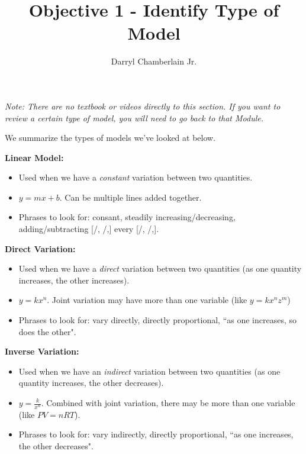 \documentclass{ximera}
\author{Darryl Chamberlain Jr.}
\title{Objective 1 - Identify Type of Model}
\begin{document}
\begin{abstract}

\end{abstract}

\maketitle
 
\textit{Note: There are no textbook or videos directly to this section. If you want to review a certain type of model, you will need to go back to that Module.}
 

We summarize the types of models we've looked at below. 

\textbf{Linear Model:}
\begin{itemize}
    \item Used when we have a \textit{constant} variation between two quantities. 
    \item $y = mx + b$. Can be multiple lines added together. 
    \item Phrases to look for: consant, steadily increasing/decreasing, adding/subtracting [/, /,] every [/, /,].
\end{itemize}

\textbf{Direct Variation:}
\begin{itemize}
    \item Used when we have a \textit{direct} variation between two quantities (as one quantity increases, the other increases).
    \item $y = kx^n$. Joint variation may have more than one variable (like $y = kx^n z^m$)
    \item Phrases to look for: vary directly, directly proportional, ``as one increases, so does the other".
\end{itemize}

\textbf{Inverse Variation:}
\begin{itemize}
    \item Used when we have an \textit{indirect} variation between two quantities (as one quantity increases, the other decreases). 
    \item $y = \frac{k}{x^n}$. Combined with joint variation, there may be more than one variable (like $PV=nRT$). 
    \item Phrases to look for: vary indirectly, directly proportional, ``as one increases, the other decreases". 
\end{itemize}
\end{document}
